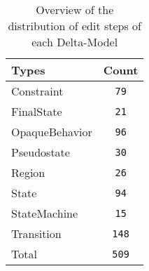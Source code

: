 \begin{table} 
 \center 
 \small 
\begin{tabular}{|l|c|}
\hline
Types & Count\\ 
  \hline 
Constraint & \texttt{79}\\ 
  \hline 
FinalState & \texttt{21}\\ 
  \hline 
OpaqueBehavior & \texttt{96}\\ 
  \hline 
Pseudostate & \texttt{30}\\ 
  \hline 
Region & \texttt{26}\\ 
  \hline 
State & \texttt{94}\\ 
  \hline 
StateMachine & \texttt{15}\\ 
  \hline 
Transition & \texttt{148}\\ 
  \hline 
Total & \texttt{509}\\ 
  \hline 
\end{tabular}
\caption[Overview: Delta-Models]{Overview of the distribution of edit steps of each Delta-Model}
\end{table}

